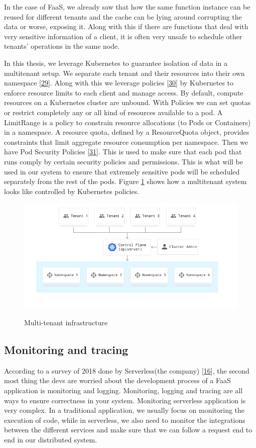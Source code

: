 \documentclass[12pt,titlepage]{article}
\begin{document}
In the case of FaaS, we already saw that how the same function instance can be
reused for different tenants and the cache can be lying around corrupting the
data or worse, exposing it. Along with this if there are functions that deal
with very sensitive information of a client, it is often very unsafe to schedule
other tenants' operations in the same node.

In this thesis, we leverage Kubernetes to guarantee isolation of data in a
multitenant setup. We separate each tenant and their resources into their own
namespace \hyperref[ref:29]{[29}]. Along with this we leverage policies \hyperref[ref:30]{[30}] by Kubernetes to enforce
resource limits to each client and manage access. By default, compute resources
on a Kubernetes cluster are unbound. With Policies we can set quotas or restrict
completely any or all kind of resources available to a pod. A LimitRange is a
policy to constrain resource allocations (to Pods or Containers) in a namespace.
A resource quota, defined by a ResourceQuota object, provides constraints that
limit aggregate resource consumption per namespace. Then we have Pod Security
Policies \hyperref[ref:31]{[31}]. This is used to make sure that each pod that runs comply by
certain security policies and permissions. This is what will be used in our
system to ensure that extremely sensitive pods will be scheduled separately
from the rest of the pods. Figure \ref{fig:multitenancy} shows how a multitenant
system looks like controlled by Kubernetes policies.

\begin{figure}[!h]
    \caption{Multi-tenant infrastructure}
    \centering
    \includegraphics[width=130mm]{./thesis_images/multitenancy.png}
    \label{fig:multitenancy}
\end{figure}

\subsection{Monitoring and tracing}
\label{sec:org6c9856c}
According to a survey of 2018 done by Serverless(the company) \hyperref[ref:16]{[16}], the
second most thing the devs are worried about the development process of a FaaS
application is monitoring and logging. Monitoring, logging and tracing are all
ways to ensure correctness in your system. Monitoring serverless application is
very complex. In a traditional application, we usually focus on monitoring the
execution of code, while in serverless, we also need to monitor the integrations
between the different services and make sure that we can follow a request end to
end in our distributed system.
\end{document}
